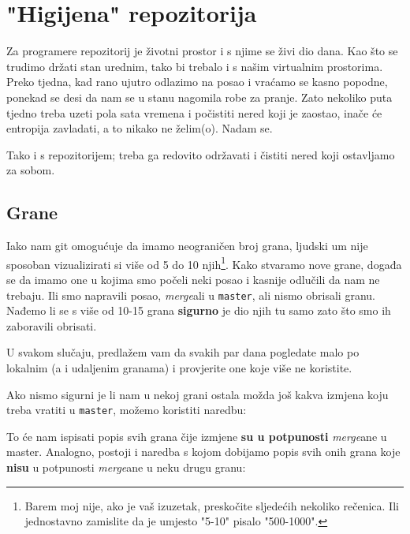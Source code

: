 \chapter*{"Higijena" repozitorija}

Za programere repozitorij je životni prostor i s njime se živi dio dana.
Kao što se trudimo držati stan urednim, tako bi trebalo i s našim virtualnim prostorima.
Preko tjedna, kad rano ujutro odlazimo na posao i vraćamo se kasno popodne, ponekad se desi da nam se u stanu nagomila robe za pranje.
Zato nekoliko puta tjedno treba uzeti pola sata vremena i počistiti nered koji je zaostao, inače će entropija zavladati, a to nikako ne želim(o).
Nadam se.

Tako i s repozitorijem; treba ga redovito održavati i čistiti nered koji ostavljamo za sobom.

\section*{Grane}

Iako nam git omogućuje da imamo neograničen broj grana, ljudski um nije sposoban vizualizirati si više od 5 do 10 njih\footnote{Barem moj nije, ako je vaš izuzetak, preskočite sljedećih nekoliko rečenica. Ili jednostavno zamislite da je umjesto "5-10" pisalo "500-1000".}.
Kako stvaramo nove grane, događa se da imamo one u kojima smo počeli neki posao i kasnije odlučili da nam ne trebaju.
Ili smo napravili posao, \emph{merge}ali u \verb+master+, ali nismo obrisali granu.
Nađemo li se s više od 10-15 grana \textbf{sigurno} je dio njih tu samo zato što smo ih zaboravili obrisati.

U svakom slučaju, predlažem vam da svakih par dana pogledate malo po lokalnim (a i udaljenim granama) i provjerite one koje više ne koristite.

Ako nismo sigurni je li nam u nekoj grani ostala možda još kakva izmjena koju treba vratiti u \verb+master+, možemo koristiti naredbu:


To će nam ispisati popis svih grana čije izmjene \textbf{su u potpunosti} \emph{merge}ane u master. 
Analogno, postoji i naredba s kojom dobijamo popis svih onih grana koje \textbf{nisu} u potpunosti \emph{merge}ane u neku drugu granu:



